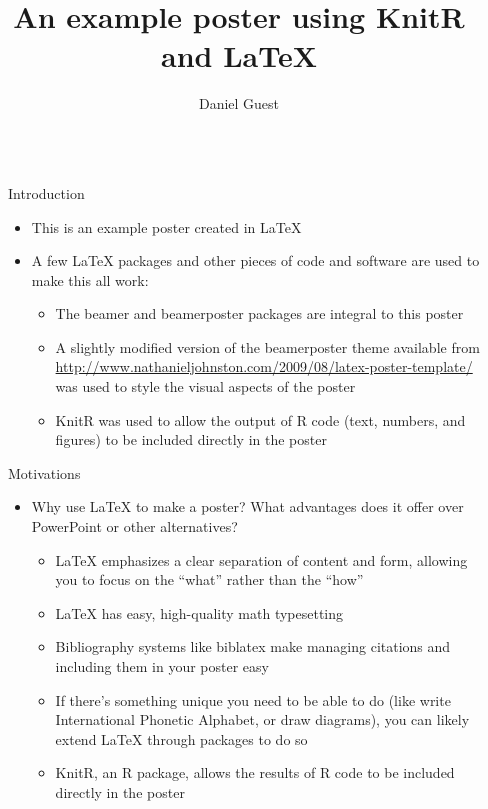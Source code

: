 \documentclass[capfont, final]{beamer}\usepackage[]{graphicx}\usepackage[]{color}
\title{An example poster using KnitR and LaTeX}
\author{Daniel Guest}
\institute{University of Minnesota, Department of Psychology, Auditory Perception and Cognition Lab}
\newlength{\sepwid}
\newlength{\onecolwid}
\begin{document}
\begin{frame}[t, fragile]
	\begin{columns}[T] %
		\begin{column}{\sepwid}\end{column} %
		\begin{column}{\onecolwid} %
				\begin{block}{Introduction}
						\begin{itemize}
							\item This is an example poster created in \LaTeX{}
							\item A few \LaTeX{} packages and other pieces of code and software are used to make this all work:
							\begin{itemize}
								\item The beamer and beamerposter packages are integral to this poster
								\item A slightly modified version of the beamerposter theme available from \url{http://www.nathanieljohnston.com/2009/08/latex-poster-template/} was used to style the visual aspects of the poster
								\item KnitR was used to allow the output of R code (text, numbers, and figures) to be included directly in the poster
							\end{itemize}
						\end{itemize}
				\end{block}
				\begin{alertblock}{Motivations}
						\begin{itemize}
							\item Why use \LaTeX{} to make a poster? What advantages does it offer over PowerPoint or other alternatives?
								\begin{itemize}
										\item LaTeX{} emphasizes a clear separation of content and form, allowing you to focus on the ``what'' rather than the ``how'' 
										\item LaTeX{} has easy, high-quality math typesetting 
										\item Bibliography systems like biblatex make managing citations and including them in your poster easy
										\item If there's something unique you need to be able to do (like write International Phonetic Alphabet, or draw diagrams), you can likely extend \LaTeX{} through packages to do so
										\item KnitR, an R package, allows the results of R code to be included directly in the poster 

\end{itemize}
\end{itemize}
\end{alertblock}
\end{column}
\end{columns}
\end{frame}
\end{document}

